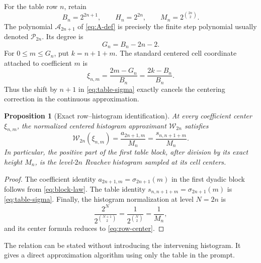 \documentclass[11pt]{article}
\newtheorem{proposition}[theorem]{Proposition}
\theoremstyle{definition}
\theoremstyle{remark}
\newcommand{\A}{\mathcal A}
\begin{document}
For the table row \(n\), retain
\begin{equation}
 B_n=2^{2n+1},\qquad H_n=2^{2n},\qquad
 M_n=2^{\binom{2n}{2}}.                                   \label{eq:BHM-row}
\end{equation}
The polynomial \(\A_{2n+1}\) of \cref{eq:A-def} is precisely the finite
step polynomial usually denoted \(\mathcal P_{2n}\).  Its degree is
\begin{equation}
 G_n=B_n-2n-2.                                             \label{eq:Gn}
\end{equation}
For \(0\leq m\leq G_n\), put \(k=n+1+m\).  The standard centered cell
coordinate attached to coefficient \(m\) is
\begin{equation}
 \xi_{n,m}=\frac{2m-G_n}{B_n}
           =\frac{2k-B_n}{B_n}.                           \label{eq:row-center}
\end{equation}
Thus the shift by \(n+1\) in \cref{eq:table-sigma} exactly cancels the
centering correction in the continuous approximation.

\begin{proposition}[Exact row--histogram identification]
\label{prop:row-histogram}
At every coefficient center \(\xi_{n,m}\), the normalized centered
histogram approximant \(\mathcal W_{2n}\) satisfies
\begin{equation}
 \mathcal W_{2n}(\xi_{n,m})
 =\frac{a_{2n+1,m}}{M_n}
 =\frac{s_{n,n+1+m}}{M_n}.                                \label{eq:row-histogram}
\end{equation}
In particular, the positive part of the first table block, after division
by its exact height \(M_n\), is the level-\(2n\) Rvachev histogram sampled
at its cell centers.
\end{proposition}

\begin{proof}
The coefficient identity
\(a_{2n+1,m}=\sigma_{2n+1}(m)\) in the first dyadic block follows from
\cref{eq:block-law}.  The table identity
\(s_{n,n+1+m}=\sigma_{2n+1}(m)\) is \cref{eq:table-sigma}.  Finally, the
histogram normalization at level \(N=2n\) is
\[
 \frac{2^{N}}{2^{\binom{N+1}{2}}}
 =\frac1{2^{\binom N2}}=\frac1{M_n},
\]
and its center formula reduces to \cref{eq:row-center}.
\end{proof}

The relation can be stated without introducing the intervening histogram.
It gives a direct approximation algorithm using only the table in the
prompt.
\end{document}
